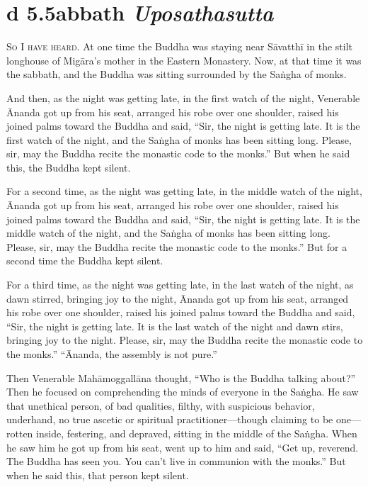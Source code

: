 \documentclass[12pt,openany]{book}%
\newcommand*{\suttatitleacronym}[1]{\smaller[2]{#1}\vspace*{.3em}}
\newcommand*{\suttatitletranslation}[1]{\linebreak{#1}}
\newcommand*{\suttatitleroot}[1]{\linebreak\smaller[2]\itshape{#1}}
\newcommand*{\tocacronym}[1]{\hspace*{-3.3em}{#1}\quad}
\newcommand*{\toctranslation}[1]{#1}
\newcommand*{\tocroot}[1]{(\textit{#1})}
\newcommand*{\scevam}[1]{\textsc{#1}}
\begin{document}
%
\section*{{\suttatitleacronym Ud 5.5}{\suttatitletranslation Sabbath }{\suttatitleroot Uposathasutta}}
\addcontentsline{toc}{section}{\tocacronym{Ud 5.5} \toctranslation{Sabbath } \tocroot{Uposathasutta}}

\scevam{So I have heard. }At one time the Buddha was staying near \textsanskrit{Sāvatthī} in the stilt longhouse of \textsanskrit{Migāra}’s mother in the Eastern Monastery. Now, at that time it was the sabbath, and the Buddha was sitting surrounded by the \textsanskrit{Saṅgha} of monks. 

And then, as the night was getting late, in the first watch of the night, Venerable Ānanda got up from his seat, arranged his robe over one shoulder, raised his joined palms toward the Buddha and said, “Sir, the night is getting late. It is the first watch of the night, and the \textsanskrit{Saṅgha} of monks has been sitting long. Please, sir, may the Buddha recite the monastic code to the monks.” But when he said this, the Buddha kept silent. 

For a second time, as the night was getting late, in the middle watch of the night, Ānanda got up from his seat, arranged his robe over one shoulder, raised his joined palms toward the Buddha and said, “Sir, the night is getting late. It is the middle watch of the night, and the \textsanskrit{Saṅgha} of monks has been sitting long. Please, sir, may the Buddha recite the monastic code to the monks.” But for a second time the Buddha kept silent. 

For a third time, as the night was getting late, in the last watch of the night, as dawn stirred, bringing joy to the night, Ānanda got up from his seat, arranged his robe over one shoulder, raised his joined palms toward the Buddha and said, “Sir, the night is getting late. It is the last watch of the night and dawn stirs, bringing joy to the night. Please, sir, may the Buddha recite the monastic code to the monks.” “Ānanda, the assembly is not pure.” 

Then Venerable \textsanskrit{Mahāmoggallāna} thought, “Who is the Buddha talking about?” Then he focused on comprehending the minds of everyone in the \textsanskrit{Saṅgha}. He saw that unethical person, of bad qualities, filthy, with suspicious behavior, underhand, no true ascetic or spiritual practitioner—though claiming to be one—rotten inside, festering, and depraved, sitting in the middle of the \textsanskrit{Saṅgha}. When he saw him he got up from his seat, went up to him and said, “Get up, reverend. The Buddha has seen you. You can’t live in communion with the monks.” But when he said this, that person kept silent. 
\end{document}
